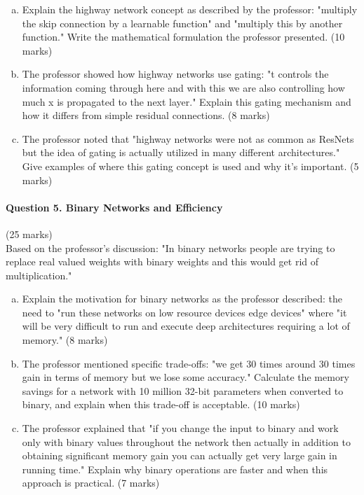 \documentclass[12pt]{article}
\newcommand{\shortanswer}{\vspace{2cm}}
\newcommand{\mediumanswer}{\vspace{3cm}}
\begin{document}
\begin{enumerate}[(a)]
    \item Explain the highway network concept as described by the professor: "multiply the skip connection by a learnable function" and "multiply this by another function." Write the mathematical formulation the professor presented. \hfill (10 marks)
    
    \mediumanswer
    
    \item The professor showed how highway networks use gating: "t controls the information coming through here and with this we are also controlling how much x is propagated to the next layer." Explain this gating mechanism and how it differs from simple residual connections. \hfill (8 marks)
    
    \mediumanswer
    
    \item The professor noted that "highway networks were not as common as ResNets but the idea of gating is actually utilized in many different architectures." Give examples of where this gating concept is used and why it's important. \hfill (5 marks)
    
    \shortanswer
\end{enumerate}

\newpage
\paragraph{Question 5. Binary Networks and Efficiency}{\hfill (25 marks)}\\
Based on the professor's discussion: "In binary networks people are trying to replace real valued weights with binary weights and this would get rid of multiplication."

\begin{enumerate}[(a)]
    \item Explain the motivation for binary networks as the professor described: the need to "run these networks on low resource devices edge devices" where "it will be very difficult to run and execute deep architectures requiring a lot of memory." \hfill (8 marks)
    
    \mediumanswer
    
    \item The professor mentioned specific trade-offs: "we get 30 times around 30 times gain in terms of memory but we lose some accuracy." Calculate the memory savings for a network with 10 million 32-bit parameters when converted to binary, and explain when this trade-off is acceptable. \hfill (10 marks)
    
    \mediumanswer
    
    \item The professor explained that "if you change the input to binary and work only with binary values throughout the network then actually in addition to obtaining significant memory gain you can actually get very large gain in running time." Explain why binary operations are faster and when this approach is practical. \hfill (7 marks)
    
    \mediumanswer
\end{enumerate}
\end{document}
